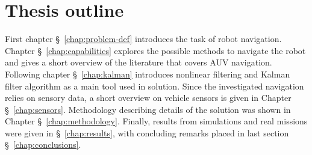 \section{Thesis outline}
First chapter \S~\ref{chap:problem-def} introduces the task of robot navigation. Chapter \S~\ref{chap:capabilities} explores the possible methods to navigate the robot and gives a short overview of the literature that covers AUV navigation. Following chapter \S~\ref{chap:kalman} introduces nonlinear filtering and Kalman filter algorithm as a main tool used in solution. Since the investigated navigation relies on sensory data, a short overview on vehicle sensors is given in Chapter \S~\ref{chap:sensors}. Methodology describing details of the solution was shown in Chapter \S~\ref{chap:methodology}. Finally, results from simulations and real missions were given in \S~\ref{chap:results}, with concluding remarks placed in last section \S~\ref{chap:conclusions}.
